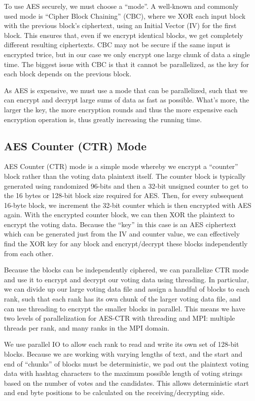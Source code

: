 \documentclass[final,5p,times,twocolumn,authoryear, 10pt]{elsarticle}
\begin{document}
To use AES securely, we must choose a ``mode''. A well-known and commonly used mode is ``Cipher Block Chaining'' (CBC), where we XOR each input
block with the previous block's ciphertext, using an Initial Vector (IV) for the first block. This ensures that, even if we encrypt identical blocks,
we get completely different resulting ciphertexts. CBC may not be secure if the same input is encrypted twice, but in our case we only encrypt one large
chunk of data a single time. The biggest issue with CBC is that it cannot be parallelized, as the key for each block depends on the previous block.

As AES is expensive, we must use a mode that can be parallelized, such that we can encrypt and decrypt large sums of data as fast as possible. What's more,
the larger the key, the more encryption rounds and thus the more expensive each encryption operation is, thus greatly increasing the running time.

\subsection{AES Counter (CTR) Mode}

AES Counter (CTR) mode is a simple mode whereby we encrypt a ``counter'' block rather than the voting data plaintext itself. The counter block
is typically generated using randomized 96-bits and then a 32-bit unsigned counter to get to the 16 bytes or 128-bit block size required for AES.
Then, for every subsequent 16-byte block, we increment the 32-bit counter which is then encrypted with AES again. With the encrypted counter block,
we can then XOR the plaintext to encrypt the voting data. Because the ``key'' in this case is an AES ciphertext which can be generated just from
the IV and counter value, we can effectively find the XOR key for any block and encrypt/decrypt these blocks independently from each other.

Because the blocks can be independently ciphered, we can parallelize CTR mode and use it to encrypt and decrypt our voting data using threading.
In particular, we can divide up our large voting data file and assign a handful of blocks to each rank, such that each rank has its own chunk of the
larger voting data file, and can use threading to encrypt the smaller blocks in parallel. This means we have two levels of parallelization for AES-CTR
with threading and MPI: multiple threads per rank, and many ranks in the MPI domain.

We use parallel IO to allow each rank to read and write its own set of 128-bit blocks. Because we are working with varying lengths of text, and the
start and end of ``chunks'' of blocks must be deterministic, we pad out the plaintext voting data with hashtag characters to the maximum possible length
of voting strings based on the number of votes and the candidates. This allows deterministic start and end byte positions to be calculated on the
receiving/decrypting side.
\end{document}
